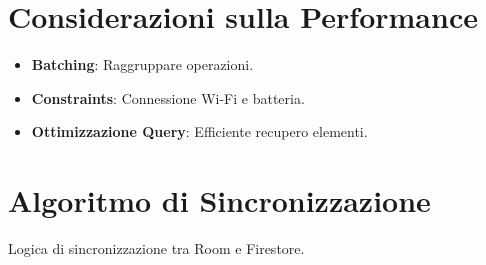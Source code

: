 \documentclass{article}
\begin{document}
\section{Considerazioni sulla
Performance}\label{sec:considerazioni-sulla-performance}
\begin{itemize}
    \item \textbf{Batching}: Raggruppare operazioni.
    \item \textbf{Constraints}: Connessione Wi-Fi e batteria.
    \item \textbf{Ottimizzazione Query}: Efficiente recupero elementi.
\end{itemize}

\section{Algoritmo di Sincronizzazione}\label{sec:algoritmo-di-sincronizzazione}
Logica di sincronizzazione tra Room e Firestore.
\end{document}
